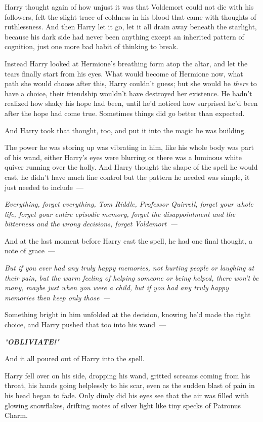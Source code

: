 Harry thought again of how unjust it was that Voldemort could not die with his
followers, felt the slight trace of coldness in his blood that came with
thoughts of ruthlessness. And then Harry let it go, let it all drain away
beneath the starlight, because his dark side had never been anything except an
inherited pattern of cognition, just one more bad habit of thinking to break.

Instead Harry looked at Hermione's breathing form atop the altar, and let the
tears finally start from his eyes. What would become of Hermione now, what path
she would choose after this, Harry couldn't guess; but she would be
\emph{there} to have a choice, their friendship wouldn't have destroyed her
existence. He hadn't realized how shaky his hope had been, until he'd noticed
how surprised he'd been after the hope had come true. Sometimes things did go
better than expected.

And Harry took that thought, too, and put it into the magic he was building.

The power he was storing up was vibrating in him, like his whole body was part
of his wand, either Harry's eyes were blurring or there was a luminous white
quiver running over the holly. And Harry thought the shape of the spell he
would cast, he didn't have much fine control but the pattern he needed was
simple, it just needed to include~---

\emph{Everything, forget everything, Tom Riddle, Professor Quirrell, forget
your whole life, forget your entire episodic memory, forget the disappointment
and the bitterness and the wrong decisions, forget Voldemort~--- }

And at the last moment before Harry cast the spell, he had one final thought, a
note of grace~---

\emph{But if you ever had any truly happy memories, not hurting people or
laughing at their pain, but the warm feeling of helping someone or being
helped, there won't be many, maybe just when you were a child, but if you had
any truly happy memories then keep only those~--- }

Something bright in him unfolded at the decision, knowing he'd made the right
choice, and Harry pushed that too into his wand~---

\emph{"\textbf{OBLIVIATE!}"}

And it all poured out of Harry into the spell.

Harry fell over on his side, dropping his wand, gritted screams coming from his
throat, his hands going helplessly to his scar, even as the sudden blast of
pain in his head began to fade. Only dimly did his eyes see that the air was
filled with glowing snowflakes, drifting motes of silver light like tiny specks
of Patronus Charm.

